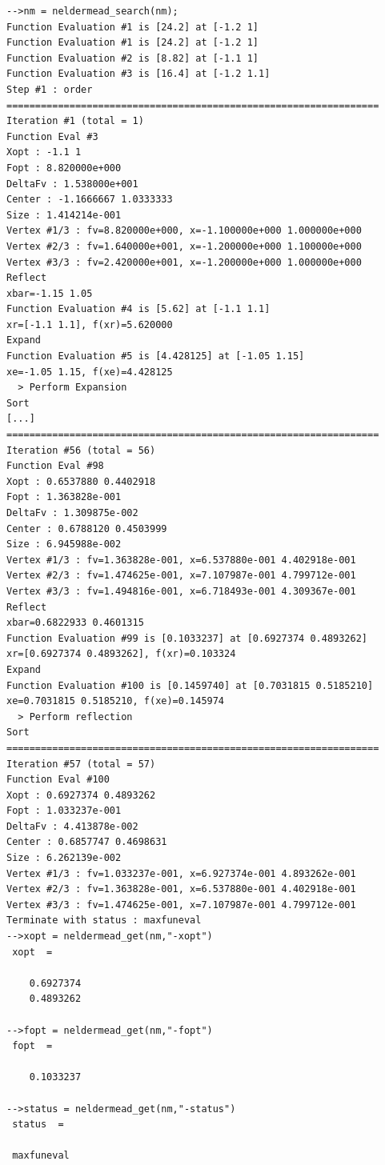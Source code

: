 \lstset{language=scilabscript}
\begin{lstlisting}
-->nm = neldermead_search(nm);
Function Evaluation #1 is [24.2] at [-1.2 1]
Function Evaluation #1 is [24.2] at [-1.2 1]
Function Evaluation #2 is [8.82] at [-1.1 1]
Function Evaluation #3 is [16.4] at [-1.2 1.1]
Step #1 : order
=================================================================
Iteration #1 (total = 1)
Function Eval #3
Xopt : -1.1 1
Fopt : 8.820000e+000
DeltaFv : 1.538000e+001
Center : -1.1666667 1.0333333
Size : 1.414214e-001
Vertex #1/3 : fv=8.820000e+000, x=-1.100000e+000 1.000000e+000
Vertex #2/3 : fv=1.640000e+001, x=-1.200000e+000 1.100000e+000
Vertex #3/3 : fv=2.420000e+001, x=-1.200000e+000 1.000000e+000
Reflect
xbar=-1.15 1.05
Function Evaluation #4 is [5.62] at [-1.1 1.1]
xr=[-1.1 1.1], f(xr)=5.620000
Expand
Function Evaluation #5 is [4.428125] at [-1.05 1.15]
xe=-1.05 1.15, f(xe)=4.428125
  > Perform Expansion
Sort
[...]
=================================================================
Iteration #56 (total = 56)
Function Eval #98
Xopt : 0.6537880 0.4402918
Fopt : 1.363828e-001
DeltaFv : 1.309875e-002
Center : 0.6788120 0.4503999
Size : 6.945988e-002
Vertex #1/3 : fv=1.363828e-001, x=6.537880e-001 4.402918e-001
Vertex #2/3 : fv=1.474625e-001, x=7.107987e-001 4.799712e-001
Vertex #3/3 : fv=1.494816e-001, x=6.718493e-001 4.309367e-001
Reflect
xbar=0.6822933 0.4601315
Function Evaluation #99 is [0.1033237] at [0.6927374 0.4893262]
xr=[0.6927374 0.4893262], f(xr)=0.103324
Expand
Function Evaluation #100 is [0.1459740] at [0.7031815 0.5185210]
xe=0.7031815 0.5185210, f(xe)=0.145974
  > Perform reflection
Sort
=================================================================
Iteration #57 (total = 57)
Function Eval #100
Xopt : 0.6927374 0.4893262
Fopt : 1.033237e-001
DeltaFv : 4.413878e-002
Center : 0.6857747 0.4698631
Size : 6.262139e-002
Vertex #1/3 : fv=1.033237e-001, x=6.927374e-001 4.893262e-001
Vertex #2/3 : fv=1.363828e-001, x=6.537880e-001 4.402918e-001
Vertex #3/3 : fv=1.474625e-001, x=7.107987e-001 4.799712e-001
Terminate with status : maxfuneval
-->xopt = neldermead_get(nm,"-xopt")
 xopt  =
 
    0.6927374  
    0.4893262  
 
-->fopt = neldermead_get(nm,"-fopt")
 fopt  =
 
    0.1033237  
 
-->status = neldermead_get(nm,"-status")
 status  =
 
 maxfuneval   
\end{lstlisting}

